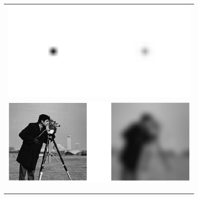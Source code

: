\documentclass{standalone}
\begin{document}
\begin{tabular}{c}
	\includegraphics[width=10cm]{pix_ges.png}\\
	\includegraphics[width=10cm]{pic.png}\\
	\\
	\\
	\hspace{0.07cm}
	\\
\end{tabular}
\end{document}
